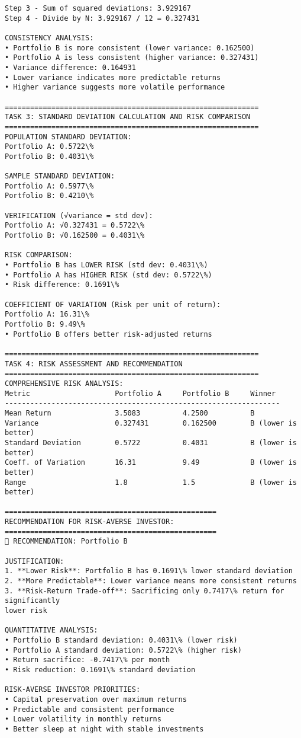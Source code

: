 \documentclass[11pt]{article}
\begin{document}
\begin{Verbatim}[commandchars=\\\{\}]
Step 3 - Sum of squared deviations: 3.929167
Step 4 - Divide by N: 3.929167 / 12 = 0.327431

CONSISTENCY ANALYSIS:
• Portfolio B is more consistent (lower variance: 0.162500)
• Portfolio A is less consistent (higher variance: 0.327431)
• Variance difference: 0.164931
• Lower variance indicates more predictable returns
• Higher variance suggests more volatile performance

============================================================
TASK 3: STANDARD DEVIATION CALCULATION AND RISK COMPARISON
============================================================
POPULATION STANDARD DEVIATION:
Portfolio A: 0.5722\%
Portfolio B: 0.4031\%

SAMPLE STANDARD DEVIATION:
Portfolio A: 0.5977\%
Portfolio B: 0.4210\%

VERIFICATION (√variance = std dev):
Portfolio A: √0.327431 = 0.5722\%
Portfolio B: √0.162500 = 0.4031\%

RISK COMPARISON:
• Portfolio B has LOWER RISK (std dev: 0.4031\%)
• Portfolio A has HIGHER RISK (std dev: 0.5722\%)
• Risk difference: 0.1691\%

COEFFICIENT OF VARIATION (Risk per unit of return):
Portfolio A: 16.31\%
Portfolio B: 9.49\%
• Portfolio B offers better risk-adjusted returns

============================================================
TASK 4: RISK ASSESSMENT AND RECOMMENDATION
============================================================
COMPREHENSIVE RISK ANALYSIS:
Metric                    Portfolio A     Portfolio B     Winner
-----------------------------------------------------------------
Mean Return               3.5083          4.2500          B
Variance                  0.327431        0.162500        B (lower is better)
Standard Deviation        0.5722          0.4031          B (lower is better)
Coeff. of Variation       16.31           9.49            B (lower is better)
Range                     1.8             1.5             B (lower is better)

==================================================
RECOMMENDATION FOR RISK-AVERSE INVESTOR:
==================================================
🎯 RECOMMENDATION: Portfolio B

JUSTIFICATION:
1. **Lower Risk**: Portfolio B has 0.1691\% lower standard deviation
2. **More Predictable**: Lower variance means more consistent returns
3. **Risk-Return Trade-off**: Sacrificing only 0.7417\% return for significantly
lower risk

QUANTITATIVE ANALYSIS:
• Portfolio B standard deviation: 0.4031\% (lower risk)
• Portfolio A standard deviation: 0.5722\% (higher risk)
• Return sacrifice: -0.7417\% per month
• Risk reduction: 0.1691\% standard deviation

RISK-AVERSE INVESTOR PRIORITIES:
• Capital preservation over maximum returns
• Predictable and consistent performance
• Lower volatility in monthly returns
• Better sleep at night with stable investments
    \end{Verbatim}
\end{document}
